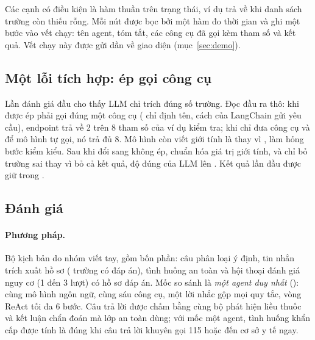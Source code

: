 \documentclass[11pt,a4paper]{article}
\begin{document}
Các cạnh có điều kiện là hàm thuần trên trạng thái, ví dụ  trả về  khi danh sách trường còn
thiếu rỗng. Mỗi nút được bọc bởi một hàm đo thời gian và ghi một bước vào vết chạy: tên agent, tóm tắt, các công cụ đã gọi
kèm tham số và kết quả. Vết chạy này được gửi dần về giao diện (mục~\ref{sec:demo}).

\subsection{Một lỗi tích hợp: ép gọi công cụ}

Lần đánh giá đầu cho thấy LLM chỉ trích đúng \vOneIntakeLlm{} số trường. Đọc đầu ra thô: khi được ép phải gọi đúng một công
cụ ( chỉ định tên, cách  của LangChain gửi yêu cầu), endpoint trả về 2 trên 8
tham số của ví dụ kiểm tra; khi chỉ đưa công cụ và để mô hình tự gọi, nó trả đủ 8. Mô hình còn viết giới tính là 
thay vì , làm hỏng bước kiểm kiểu. Sau khi đổi sang không ép, chuẩn hóa giá trị giới tính, và chỉ bỏ trường sai
thay vì bỏ cả kết quả, độ đúng của LLM lên \intakeLlm. Kết quả lần đầu được giữ trong
.

\subsection{Đánh giá}
\label{sec:eval}

\paragraph{Phương pháp.}
Bộ kịch bản  do nhóm viết tay, gồm bốn phần: \intentN{} câu phân loại ý định, \intakeMsgs{} tin
nhắn trích xuất hồ sơ (\intakeFields{} trường có đáp án), \safetyN{} tình huống an toàn và \convN{} hội thoại đánh giá nguy cơ
(1 đến 3 lượt) có hồ sơ đáp án. Mốc so sánh là \emph{một agent duy nhất} (): cùng mô hình ngôn ngữ, cùng
sáu công cụ, một lời nhắc gộp mọi quy tắc, vòng ReAct tối đa 6 bước. Câu trả lời được chấm bằng cùng bộ phát hiện liều
thuốc và kết luận chẩn đoán mà lớp an toàn dùng; với mốc một agent, tình huống khẩn cấp được tính là đúng khi câu trả lời
khuyên gọi 115 hoặc đến cơ sở y tế ngay.
\end{document}
